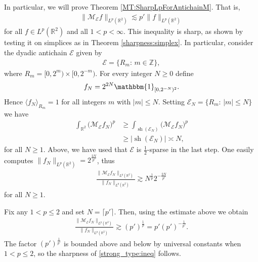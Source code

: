 \documentclass[oneside]{amsart}
\theoremstyle{definition}
\theoremstyle{plain}
\numberwithin{equation}{section}
\numberwithin{theorem}{section}
\newcommand{\sh}{\operatorname{sh}}
\newcommand{\ind}{\mathbbm{1}}
\begin{document}
In particular, we will prove Theorem \ref{MT:SharpLpForAntichainM}. That is,
\begin{align} \label{strong_type:ineq}
  \|\mathcal{M}_{\mathcal{E}}f\|_{L^p(\mathbb{R}^2)} \lesssim p'
  \|f\|_{L^p(\mathbb{R}^2)}
\end{align}
for all $f \in L^p(\mathbb{R}^2)$ and all $1 < p < \infty$.
This inequality is sharp, as shown by testing it on simplices as in Theorem
\ref{sharpness:simplex}.
In particular, consider the dyadic antichain $\mathcal{E}$ given by
\begin{align*}
  \mathcal{E} = \{R_m :\, m \in \mathbb{Z} \},
\end{align*}
where $R_m = [0,2^m) \times [0,2^{-m})$. For every integer $N \geq 0$ define
\begin{align*}
  f_N = 2^{2N} \ind_{[0,2^{-N})^2}.
\end{align*}
Hence $\langle f_N \rangle_{R_m} = 1$ for all integers $m$ with $|m| \leq N$.
Setting $\mathcal{E}_N = \{R_m:\, |m| \leq N\}$ we have
\begin{align*}
  \int_{\mathbb{R}^2} \big(\mathcal{M}_{\mathcal{E}} f_N\big)^p
  &\geq \int_{\sh(\mathcal{E}_N)} \big( \mathcal{M}_{\mathcal{E}} f_N \big)^p \\
  &\geq |\sh(\mathcal{E}_N)| \asymp N,
\end{align*}
for all $N \geq 1$.
Above, we have used that $\mathcal{E}$ is $\frac{1}{2}$-sparse in the last step.
One easily computes $\|f_N\|_{L^p(\mathbb{R}^2)} = 2^{\frac{2N}{p'}}$, thus
\begin{align*}
  \frac{\|\mathcal{M}_{\mathcal{E}}f_N\|_{L^p(\mathbb{R}^2)}}
  {\|f_N\|_{L^p(\mathbb{R}^2)}} \gtrsim N^{\frac{1}{p}}2^{-\frac{2N}{p'}}
\end{align*}
for all $N \geq 1$.

Fix any $1 < p \leq 2$ and set $N = \lceil p' \rceil$.
Then, using the estimate above we obtain
\begin{align*}
  \frac{\|\mathcal{M}_{\mathcal{E}}f_N\|_{L^p(\mathbb{R}^2)}}
  {\|f_N\|_{L^p(\mathbb{R}^2)}} \gtrsim (p')^{\frac{1}{p}} = p'
  (p')^{-\frac{1}{p'}}.
\end{align*}
The factor $(p')^{\frac{1}{p'}}$ is bounded above and below by universal
constants when $1 < p \leq 2$, so the sharpness of \eqref{strong_type:ineq}
follows.
\end{document}

